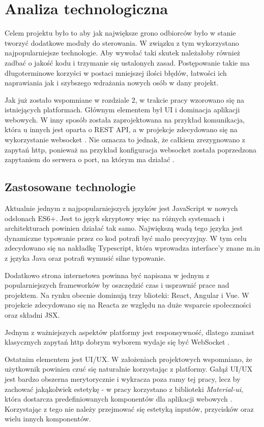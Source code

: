 \chapter{Analiza technologiczna}
Celem projektu było to aby jak największe grono odbiorców było w stanie tworzyć dodatkowe moduły do sterowania. W związku z tym wykorzystano najpopularniejsze technologie. Aby wywołać taki skutek należałoby również zadbać o jakość kodu i trzymanie się ustalonych zasad. Postępowanie takie ma długoterminowe korzyści w postaci mniejszej ilości błędów, łatwości ich naprawiania jak i szybszego wdrażania nowych osób w dany projekt. 
\par Jak już zostało wspomniane w rozdziale 2, w trakcie pracy wzorowano się na istniejących platformach. Głównym elementem był UI i dominacja aplikacji webowych. W inny sposób została zaprojektowana na przykład komunikacja, która u innych jest oparta o REST API, a w projekcje zdecydowano się na wykorzystanie websocket \cite{websocket}. Nie oznacza to jednak, że całkiem zrezygnowano z zapytań http, ponieważ na przykład konfiguracja websocket została poprzedzona zapytaniem do serwera o port, na którym ma działać \cite{express}.
\section{Zastosowane technologie}
Aktualnie jednym z najpopularniejszych języków jest JavaScript \cite{javascript} w nowych odsłonach ES6+. Jest to język skryptowy więc na różnych systemach i architekturach powinien działać tak samo. Największą wadą tego języka jest dynamiczne typowanie przez co kod potrafi być mało precyzyjny. W tym celu zdecydowano się na nakładkę Typescript, która wprowadza interface'y znane m.in z języka Java  oraz potrafi wymusić silne typowanie. \par Dodatkowo strona internetowa powinna być napisana w jednym z popularniejszych frameworków by oszczędzić czas i usprawnić prace nad projektem. Na rynku obecnie dominują trzy blioteki: React, Angular i Vue. W projekcie zdecydowano się na Reacta  \cite{React} ze względu na duże wsparcie społeczności oraz składni JSX. \par
Jednym z ważniejszych aspektów platformy jest responsywność, dlatego zamiast klasycznych zapytań http dobrym wyborem wydaje się być WebSocket \cite{websocket}. 
\par Ostatnim elementem jest UI/UX. W założeniach projektowych wspomniano, że użytkownik powinien czuć się naturalnie korzystając z platformy. Gałąź UI/UX jest bardzo obszerna merytorycznie i wykracza poza ramy tej pracy, lecz by zachować jakąkolwiek estetykę - w pracy korzystano z biblioteki \textit{Material-ui}, która dostarcza predefiniowanych komponentów dla aplikacji webowych \cite{materialui}. Korzystając z tego nie należy przejmować się estetyką inputów, przycisków oraz wielu innych komponentów. 
